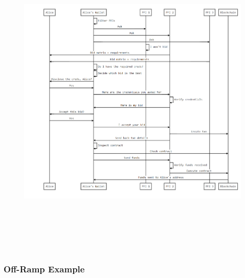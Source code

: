 \documentclass[11pt]{article}
\begin{document}
\vspace{1\baselineskip}
\begin{figure}[H]
\centering
\includegraphics[width=16.4cm,height=15.3cm]{./diagrams/on-ramp.png}
\end{figure}


\subsubsection{Off-Ramp Example}
\end{document}

